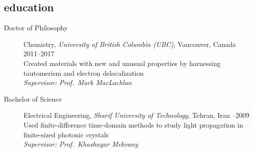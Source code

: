 \documentclass[overlapped,line,10pt,letterpaper]{res}
\begin{document}
\begin{resume}
\section{education}
\begin{description}
\item [Doctor of Philosophy] Chemistry, \emph{University of British Columbia (UBC)}, Vancouver, Canada \hspace{\fill} 2011–2017 \\
Created materials with new and unusual properties by harnessing tautomerism and electron delocalization \\
\emph{Supervisor: Prof.\ Mark MacLachlan}
\item [Bachelor of Science] Electrical Engineering, \emph{Sharif University of Technology}, Tehran, Iran \hspace{}–2009 \\
Used finite-difference time-domain methods to study light propagation in finite-sized photonic crystals \\
\emph{Supervisor: Prof.\ Khashayar Mehrany}
\end{description}


\end{resume}
\end{document}
